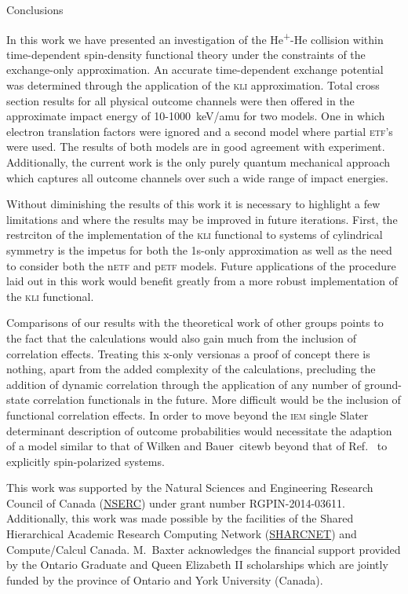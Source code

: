 \documentclass[aps, pra, reprint, groupedaddress, amsfonts,
               amsmath, amssymb, showpacs, nofootinbib]{revtex4-1}
\begin{document}
\begin{section}{Conclusions \label{sec:conc}}

   In this work we have presented an investigation of the He\textsuperscript{+}-He collision within 
   time-dependent spin-density functional theory under the constraints of the exchange-only
   approximation. An accurate time-dependent exchange potential was determined through the application
   of the \textsc{kli} approximation. Total cross section results for all physical outcome channels were
   then offered in the approximate impact energy of 10-1000~keV/amu for two models. One in which
   electron translation factors were ignored and a second model where partial \textsc{etf}'s were used.
   The results of both models are in good agreement with experiment. Additionally, the current work is
   the only purely quantum mechanical approach which captures all outcome channels over such a wide
   range of impact energies.

   Without diminishing the results of this work it is necessary to highlight a few limitations and where
   the results may be improved in future iterations. First, the restrciton of the implementation of the 
   \textsc{kli} functional to systems of cylindrical symmetry is the impetus for both the 1s-only
   approximation as well as the need to consider both the n\textsc{etf} and p\textsc{etf} models. Future
   applications of the procedure laid out in this work would benefit greatly from a more robust
   implementation of the \textsc{kli} functional.

   Comparisons of our results with the theoretical work of other groups points to the fact that the
   calculations would also gain much from the inclusion of correlation effects. Treating this x-only
   versionas a proof of concept there is nothing, apart from the added complexity of the calculations,
   precluding the addition of dynamic correlation through the application of any number of ground-state
   correlation functionals in the future. More difficult would be the inclusion of functional
   correlation effects. In order to move beyond the \textsc{iem} single Slater determinant description
   of outcome probabilities would necessitate the adaption of a model similar to that of Wilken and
   Bauer~cite{wb} beyond that of Ref.~\cite{p-he2p-he} to explicitly spin-polarized systems.

\end{section}

\begin{acknowledgments}

   This work was supported by the Natural Sciences and Engineering Research Council
   of Canada (\href{http://www.nserc-crsng.gc.ca/}{NSERC}) under grant number RGPIN-2014-03611.
   Additionally, this work was made possible by the facilities of the Shared Hierarchical Academic
   Research Computing Network (\href{www.sharcnet.ca}{SHARCNET}) and Compute/Calcul Canada. M.\ Baxter
   acknowledges the financial support provided by the Ontario Graduate and Queen Elizabeth \textsc{II}
   scholarships which are jointly funded by the province of Ontario and York University (Canada).

\end{acknowledgments}


\end{document}
